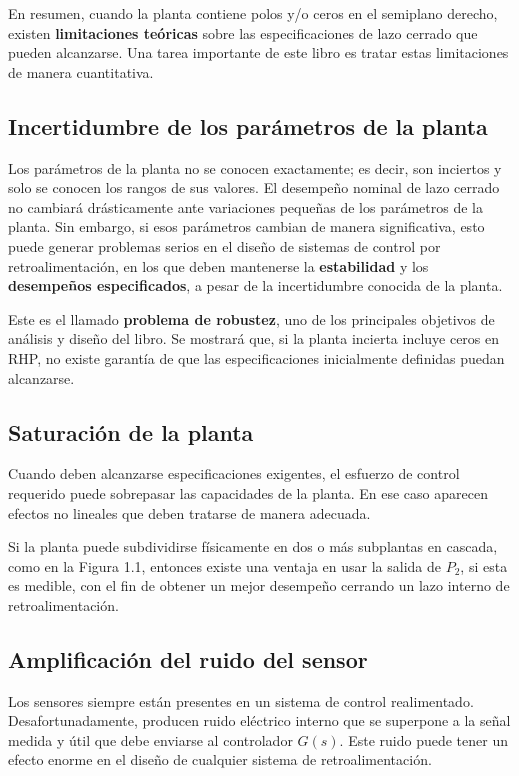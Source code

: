 En resumen, cuando la planta contiene polos y/o ceros en el semiplano derecho, existen \textbf{limitaciones teóricas} sobre las especificaciones de lazo cerrado que pueden alcanzarse. Una tarea importante de este libro es tratar estas limitaciones de manera cuantitativa.

\subsection{Incertidumbre de los parámetros de la planta}
Los parámetros de la planta no se conocen exactamente; es decir, son inciertos y solo se conocen los rangos de sus valores. El desempeño nominal de lazo cerrado no cambiará drásticamente ante variaciones pequeñas de los parámetros de la planta. Sin embargo, si esos parámetros cambian de manera significativa, esto puede generar problemas serios en el diseño de sistemas de control por retroalimentación, en los que deben mantenerse la \textbf{estabilidad} y los \textbf{desempeños especificados}, a pesar de la incertidumbre conocida de la planta.

Este es el llamado \textbf{problema de robustez}, uno de los principales objetivos de análisis y diseño del libro. Se mostrará que, si la planta incierta incluye ceros en RHP, no existe garantía de que las especificaciones inicialmente definidas puedan alcanzarse.

\subsection{Saturación de la planta}
Cuando deben alcanzarse especificaciones exigentes, el esfuerzo de control requerido puede sobrepasar las capacidades de la planta. En ese caso aparecen efectos no lineales que deben tratarse de manera adecuada.

Si la planta puede subdividirse físicamente en dos o más subplantas en cascada, como en la Figura 1.1, entonces existe una ventaja en usar la salida de \(P_2\), si esta es medible, con el fin de obtener un mejor desempeño cerrando un lazo interno de retroalimentación.

\subsection{Amplificación del ruido del sensor}
Los sensores siempre están presentes en un sistema de control realimentado. Desafortunadamente, producen ruido eléctrico interno que se superpone a la señal medida y útil que debe enviarse al controlador \(G(s)\). Este ruido puede tener un efecto enorme en el diseño de cualquier sistema de retroalimentación.

